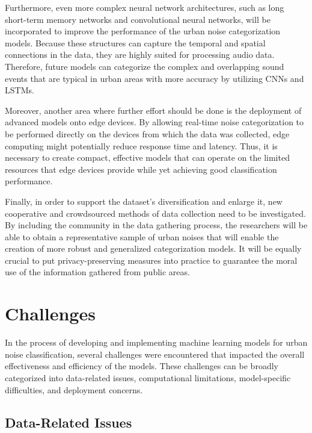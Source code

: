 \documentclass[conference]{IEEEtran}
\begin{document}
Furthermore, even more complex neural network architectures, such as long short-term memory networks and convolutional neural networks, will be incorporated to improve the performance of the urban noise categorization models.\cite{tsalera2020monitoring} Because these structures can capture the temporal and spatial connections in the data, they are highly suited for processing audio data. Therefore, future models can categorize the complex and overlapping sound events that are typical in urban areas with more accuracy by utilizing CNNs and LSTMs.

Moreover, another area where further effort should be done is the deployment of advanced models onto edge devices.\cite{tsalera2020monitoring} By allowing real-time noise categorization to be performed directly on the devices from which the data was collected, edge computing might potentially reduce response time and latency. Thus, it is necessary to create compact, effective models that can operate on the limited resources that edge devices provide while yet achieving good classification performance.

Finally, in order to support the dataset's diversification and enlarge it, new cooperative and crowdsourced methods of data collection need to be investigated. By including the community in the data gathering process, the researchers will be able to obtain a representative sample of urban noises that will enable the creation of more robust and generalized categorization models.\cite{mishachandar2021diverse} It will be equally crucial to put privacy-preserving measures into practice to guarantee the moral use of the information gathered from public areas.


\section{Challenges}

In the process of developing and implementing machine learning models for urban noise classification, several challenges were encountered that impacted the overall effectiveness and efficiency of the models. These challenges can be broadly categorized into data-related issues, computational limitations, model-specific difficulties, and deployment concerns.

\subsection{Data-Related Issues}
\end{document}
